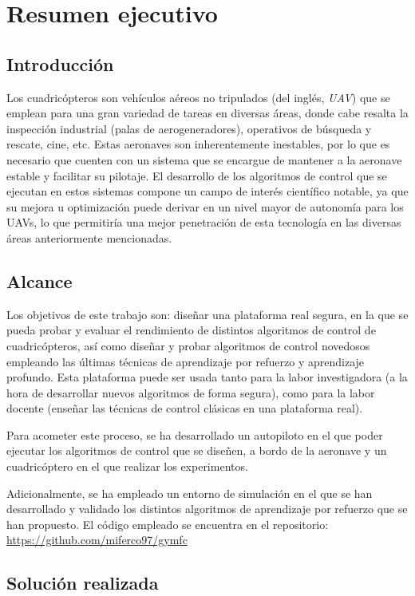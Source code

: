 \chapter*{Resumen ejecutivo}
\section*{Introducción}
Los cuadricópteros son vehículos aéreos no tripulados (del inglés, \textit{UAV}) que se emplean para una gran variedad de tareas en diversas áreas, donde cabe resalta la inspección industrial (palas de aerogeneradores), operativos de búsqueda y rescate, cine, etc. Estas aeronaves son inherentemente inestables, por lo que es necesario que cuenten con un sistema que se encargue de mantener a la aeronave estable y facilitar su pilotaje. El desarrollo de los algoritmos de control que se ejecutan en estos sistemas compone un campo de interés científico notable, ya que su mejora u optimización puede derivar en un nivel mayor de autonomía para los UAVs, lo que permitiría una mejor penetración de esta tecnología en las diversas áreas anteriormente mencionadas.

\section*{Alcance}

Los objetivos de este trabajo son: diseñar una plataforma real segura, en la que se pueda probar y evaluar el rendimiento de distintos algoritmos de control de cuadricópteros, así como diseñar y probar algoritmos de control novedosos empleando las últimas técnicas de aprendizaje por refuerzo y aprendizaje profundo. Esta plataforma puede ser usada tanto para la labor investigadora (a la hora de desarrollar nuevos algoritmos de forma segura), como para la labor docente (enseñar las técnicas de control clásicas en una plataforma real).

Para acometer este proceso, se ha desarrollado un autopiloto en el que poder ejecutar los algoritmos de control que se diseñen, a bordo de la aeronave y un cuadricóptero en el que realizar los experimentos.

Adicionalmente, se ha empleado un entorno de simulación en el que se han desarrollado y validado los distintos algoritmos de aprendizaje por refuerzo que se han propuesto. El código empleado se encuentra en el repositorio: \url{https://github.com/miferco97/gymfc}

\section*{Solución realizada}


